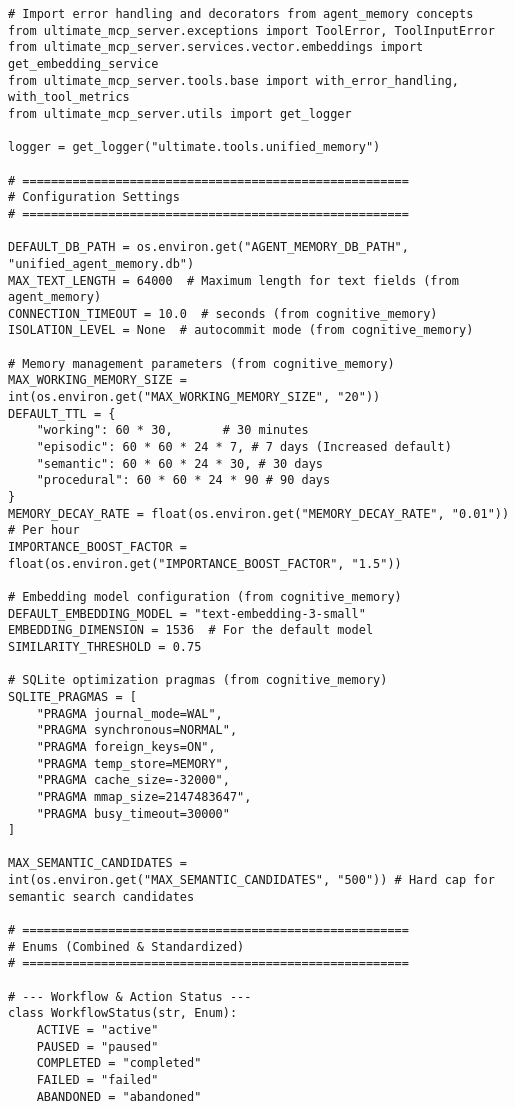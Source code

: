 \documentclass[12pt,a4paper]{article}
\begin{document}
\begin{pageablecode}
\begin{verbatim}
# Import error handling and decorators from agent_memory concepts
from ultimate_mcp_server.exceptions import ToolError, ToolInputError
from ultimate_mcp_server.services.vector.embeddings import get_embedding_service
from ultimate_mcp_server.tools.base import with_error_handling, with_tool_metrics
from ultimate_mcp_server.utils import get_logger

logger = get_logger("ultimate.tools.unified_memory")

# ======================================================
# Configuration Settings
# ======================================================

DEFAULT_DB_PATH = os.environ.get("AGENT_MEMORY_DB_PATH", "unified_agent_memory.db")
MAX_TEXT_LENGTH = 64000  # Maximum length for text fields (from agent_memory)
CONNECTION_TIMEOUT = 10.0  # seconds (from cognitive_memory)
ISOLATION_LEVEL = None  # autocommit mode (from cognitive_memory)

# Memory management parameters (from cognitive_memory)
MAX_WORKING_MEMORY_SIZE = int(os.environ.get("MAX_WORKING_MEMORY_SIZE", "20"))
DEFAULT_TTL = {
    "working": 60 * 30,       # 30 minutes
    "episodic": 60 * 60 * 24 * 7, # 7 days (Increased default)
    "semantic": 60 * 60 * 24 * 30, # 30 days
    "procedural": 60 * 60 * 24 * 90 # 90 days
}
MEMORY_DECAY_RATE = float(os.environ.get("MEMORY_DECAY_RATE", "0.01"))  # Per hour
IMPORTANCE_BOOST_FACTOR = float(os.environ.get("IMPORTANCE_BOOST_FACTOR", "1.5"))

# Embedding model configuration (from cognitive_memory)
DEFAULT_EMBEDDING_MODEL = "text-embedding-3-small"
EMBEDDING_DIMENSION = 1536  # For the default model
SIMILARITY_THRESHOLD = 0.75

# SQLite optimization pragmas (from cognitive_memory)
SQLITE_PRAGMAS = [
    "PRAGMA journal_mode=WAL",
    "PRAGMA synchronous=NORMAL",
    "PRAGMA foreign_keys=ON",
    "PRAGMA temp_store=MEMORY",
    "PRAGMA cache_size=-32000",
    "PRAGMA mmap_size=2147483647",
    "PRAGMA busy_timeout=30000"
]

MAX_SEMANTIC_CANDIDATES = int(os.environ.get("MAX_SEMANTIC_CANDIDATES", "500")) # Hard cap for semantic search candidates

# ======================================================
# Enums (Combined & Standardized)
# ======================================================

# --- Workflow & Action Status ---
class WorkflowStatus(str, Enum):
    ACTIVE = "active"
    PAUSED = "paused"
    COMPLETED = "completed"
    FAILED = "failed"
    ABANDONED = "abandoned"


\end{verbatim}
\end{pageablecode}
\end{document}
